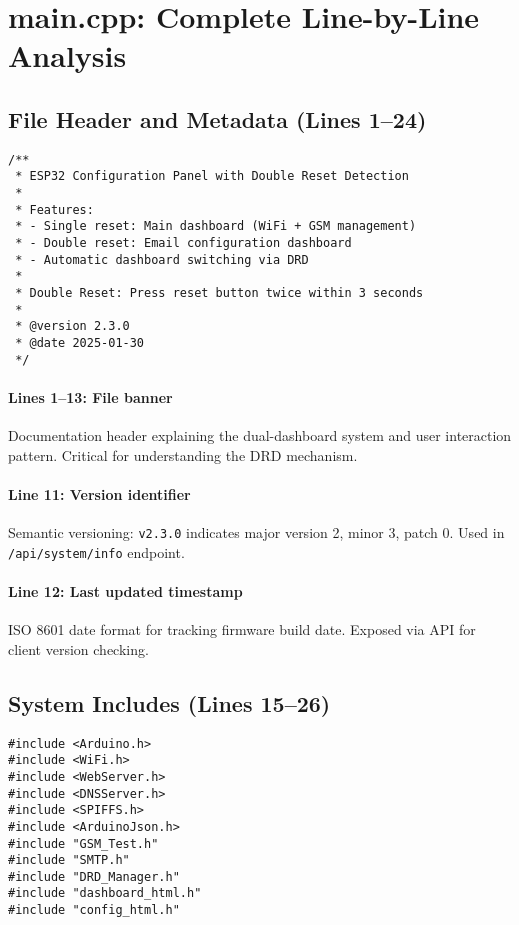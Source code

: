 \documentclass[11pt,a4paper]{article}
\begin{document}
\section{main.cpp: Complete Line-by-Line Analysis}

\subsection{File Header and Metadata (Lines 1--24)}

\begin{verbatim}
/**
 * ESP32 Configuration Panel with Double Reset Detection
 * 
 * Features:
 * - Single reset: Main dashboard (WiFi + GSM management)
 * - Double reset: Email configuration dashboard
 * - Automatic dashboard switching via DRD
 * 
 * Double Reset: Press reset button twice within 3 seconds
 * 
 * @version 2.3.0
 * @date 2025-01-30
 */
\end{verbatim}

\paragraph{Lines 1--13: File banner}
Documentation header explaining the dual-dashboard system and user interaction pattern. Critical for understanding the DRD mechanism.

\paragraph{Line 11: Version identifier}
Semantic versioning: \texttt{v2.3.0} indicates major version 2, minor 3, patch 0. Used in \texttt{/api/system/info} endpoint.

\paragraph{Line 12: Last updated timestamp}
ISO 8601 date format for tracking firmware build date. Exposed via API for client version checking.

\subsection{System Includes (Lines 15--26)}

\begin{verbatim}
#include <Arduino.h>
#include <WiFi.h>
#include <WebServer.h>
#include <DNSServer.h>
#include <SPIFFS.h>
#include <ArduinoJson.h>
#include "GSM_Test.h"
#include "SMTP.h"
#include "DRD_Manager.h"
#include "dashboard_html.h"
#include "config_html.h"
\end{verbatim}
\end{document}
